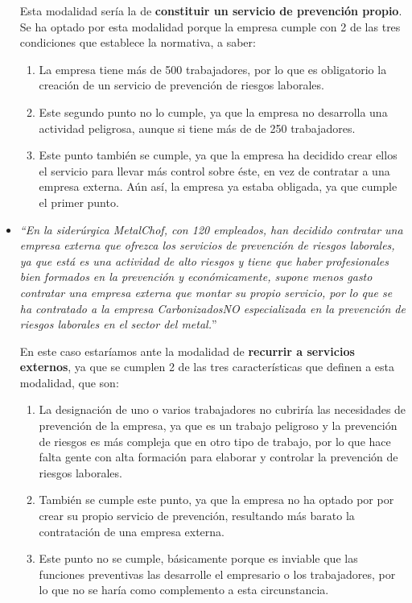 \begin{itemize}
    Esta modalidad sería la de \textbf{constituir un servicio de prevención propio}. Se ha optado por esta modalidad porque la empresa cumple con 2 de las tres condiciones que establece la normativa, a saber:

    \begin{enumerate}
        \item La empresa tiene más de 500 trabajadores, por lo que es obligatorio la creación de un servicio de prevención de riesgos laborales.
        \item Este segundo punto no lo cumple, ya que la empresa no desarrolla una actividad peligrosa, aunque si tiene más de de 250 trabajadores.
        \item Este punto también se cumple, ya que la empresa ha decidido crear ellos el servicio para llevar más control sobre éste, en vez de contratar a una empresa externa. Aún así, la empresa ya estaba obligada, ya que cumple el primer punto.
    \end{enumerate}

    \item \textit{``En la siderúrgica MetalChof, con 120 empleados, han decidido contratar una empresa externa que ofrezca los servicios de prevención de riesgos laborales, ya que está es una actividad de alto riesgos y tiene que haber profesionales bien formados en la prevención y económicamente, supone menos gasto contratar una empresa externa que montar su propio servicio, por lo que se ha contratado a la empresa CarbonizadosNO especializada en la prevención de riesgos laborales en el sector del metal.}''

    En este caso estaríamos ante la modalidad de \textbf{recurrir a servicios externos}, ya que se cumplen 2 de las tres características que definen a esta modalidad, que son:
    \begin{enumerate}
        \item La designación de uno o varios trabajadores no cubriría las necesidades de prevención de la empresa, ya que es un trabajo peligroso y la prevención de riesgos es más compleja que en otro tipo de trabajo, por lo que hace falta gente con alta formación para elaborar y controlar la prevención de riesgos laborales.

        \item También se cumple este punto, ya que la empresa no ha optado por por crear su propio servicio de prevención, resultando más barato la contratación de una empresa externa.

        \item Este punto no se cumple, básicamente porque es inviable que las funciones preventivas las desarrolle el empresario o los trabajadores, por lo que no se haría como complemento a esta circunstancia.
    \end{enumerate}
\end{itemize}


